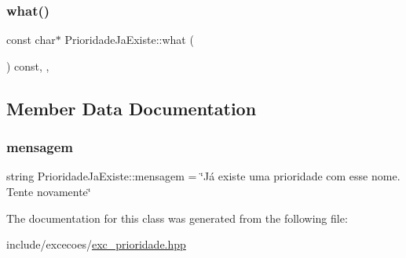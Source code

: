 \subsubsection{\texorpdfstring{what()}{what()}}
{\footnotesize\ttfamily const char$\ast$ Prioridade\+Ja\+Existe\+::what (\begin{DoxyParamCaption}{ }\end{DoxyParamCaption}) const\hspace{0.3cm}{\ttfamily [inline]}, {\ttfamily [override]}, {\ttfamily [noexcept]}}



\subsection{Member Data Documentation}
\mbox{\label{classPrioridadeJaExiste_aceee66510e48bda05955378f9e481104}} 
\subsubsection{\texorpdfstring{mensagem}{mensagem}}
{\footnotesize\ttfamily string Prioridade\+Ja\+Existe\+::mensagem = \char`\"{}Já existe uma prioridade com esse nome. Tente novamente\char`\"{}\hspace{0.3cm}{\ttfamily [private]}}



The documentation for this class was generated from the following file\+:\begin{DoxyCompactItemize}
\item 
include/excecoes/\hyperlink{exc__prioridade_8hpp}{exc\+\_\+prioridade.\+hpp}\end{DoxyCompactItemize}
